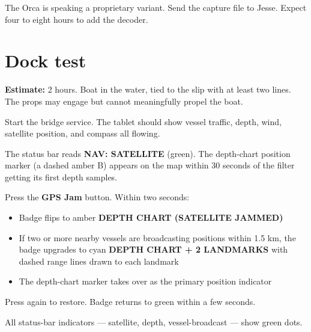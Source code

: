 \documentclass[10pt,a4paper]{article}
\begin{document}
\begin{warnbox}
The Orca is speaking a proprietary variant. Send the capture file to
Jesse. Expect four to eight hours to add the decoder.
\end{warnbox}

\section{Dock test}
\textbf{Estimate:} 2 hours. Boat in the water, tied to the slip with
at least two lines. The props may engage but cannot meaningfully
propel the boat.

\begin{stepbox}
Start the bridge service. The tablet should show vessel traffic,
depth, wind, satellite position, and compass all flowing.
\end{stepbox}

\begin{stepbox}
The status bar reads \textbf{NAV: SATELLITE} (green). The depth-chart
position marker (a dashed amber B) appears on the map within
30 seconds of the filter getting its first depth samples.
\end{stepbox}

\begin{stepbox}
Press the \textbf{GPS Jam} button. Within two seconds:
\begin{itemize}
\item Badge flips to amber \textbf{DEPTH CHART (SATELLITE JAMMED)}
\item If two or more nearby vessels are broadcasting positions within
      1.5 km, the badge upgrades to cyan \textbf{DEPTH CHART + 2 LANDMARKS}
      with dashed range lines drawn to each landmark
\item The depth-chart marker takes over as the primary position indicator
\end{itemize}
Press again to restore. Badge returns to green within a few seconds.
\end{stepbox}

\begin{stepbox}
All status-bar indicators --- satellite, depth, vessel-broadcast ---
show green dots.
\end{stepbox}

\begin{safetybox}
\end{safetybox}
\end{document}
